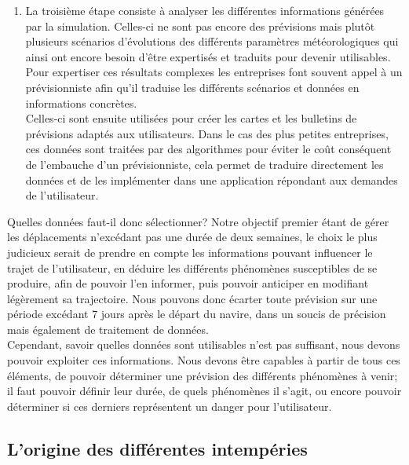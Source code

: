 \documentclass[12pt]{report}
\begin{document}
\begin{enumerate}
            \item La troisième étape consiste à analyser les différentes informations générées par la simulation. Celles-ci ne sont pas encore des prévisions mais plutôt plusieurs scénarios d’évolutions des différents paramètres météorologiques qui ainsi ont encore besoin d'être expertisés et traduits pour devenir utilisables.
            Pour expertiser ces résultats complexes les entreprises font souvent appel à un prévisionniste afin qu’il traduise les différents scénarios et données en informations concrètes.\\ 
            Celles-ci sont ensuite utilisées pour créer les cartes et les bulletins de prévisions adaptés aux utilisateurs. Dans le cas des plus petites entreprises, ces données sont traitées par des algorithmes pour éviter le coût conséquent de l’embauche d’un prévisionniste, cela permet de traduire directement les données et de les implémenter dans une application répondant aux demandes de l’utilisateur.\\

        \end{enumerate}
    
    Quelles données faut-il donc sélectionner? Notre objectif premier étant de gérer les déplacements n’excédant pas une durée de deux semaines, le choix le plus judicieux serait de prendre en compte les informations pouvant influencer le trajet de l’utilisateur, en déduire les différents phénomènes susceptibles de se produire, afin de pouvoir l’en informer, puis pouvoir anticiper en modifiant légèrement sa trajectoire.
    Nous pouvons donc écarter toute prévision sur une période excédant 7 jours après le départ du navire, dans un soucis de précision mais également de traitement de données.\\

    Cependant, savoir quelles données sont utilisables n’est pas suffisant, nous devons pouvoir exploiter ces informations.
    Nous devons être capables à partir de tous ces éléments, de pouvoir déterminer une prévision des différents phénomènes à venir; il faut pouvoir définir leur durée, de quels phénomènes il s’agit, ou encore pouvoir déterminer si ces derniers représentent un danger pour l’utilisateur.
    \clearpage
    
    \subsection{L'origine des différentes intempéries}
\end{document}
